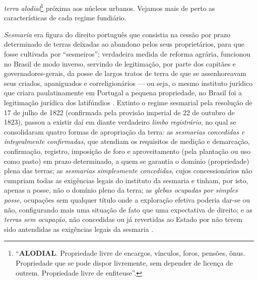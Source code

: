 \textit{terra alodial}\footnote{``\textbf{ALODIAL}. Propriedade livre de encargos, vínculos, foros, pensões, ônus. Propriedade que se pode dispor livremente, sem depender de licença de outrem. Propriedade livre de enfiteuse''\cite[p.~30]{soibelman_enciclo_1979}.} próxima aos núcleos urbanos. Vejamos mais de perto as características de cada regime fundiário.

\textit{Sesmaria} era figura do direito português que consistia na cessão por prazo determinado de terras deixadas ao abandono pelos seus proprietários, para que fosse cultivada por ``sesmeiros''; verdadeira medida de reforma agrária, funcionou no Brasil de modo inverso, servindo de legitimação, por parte dos capitães e governadores-gerais, da posse de largos tratos de terra de que se assenhoreavam seus criados, apaniguados e correligionários --- ou seja, o mesmo instituto jurídico que criara paulatinamente em Portugal a pequena propriedade, no Brasil foi a legitimação jurídica dos latifúndios \cite[pp.~42-51]{costaporto_sesmaria_1980}.  Extinto o regime sesmarial pela resolução de 17 de julho de 1822 (confirmada pela provisão imperial de 22 de outubro de 1823), passou a existir daí em diante verdadeiro \textit{limbo registrário}, no qual se consolidaram quatro formas de apropriação da terra: as \textit{sesmarias concedidas e integralmente confirmadas}, que atendiam os requisitos de medição e demarcação, confirmação, registro, imposição de foro e aproveitamento (pela plantação ou uso como pasto) em prazo determinado, a quem se garantia o domínio (propriedade) plena das terras; as \textit{sesmarias simplesmente concedidas}, cujos concessionários não cumpriam todas as exigências legais do instituto da sesmaria e tinham, por isto, apenas a posse, não o domínio pleno da terra; as \textit{glebas ocupadas por simples posse}, ocupações sem qualquer título onde a exploração efetiva poderia dar-se ou não, configurando mais uma situação de fato que uma expectativa de direito; e as \textit{terras sem ocupação}, não concedidas ou já revertidas ao Estado por não terem sido antendidas as exigências legais da sesmaria \cite[p.~43]{sodero_diragrario_1990}. 


